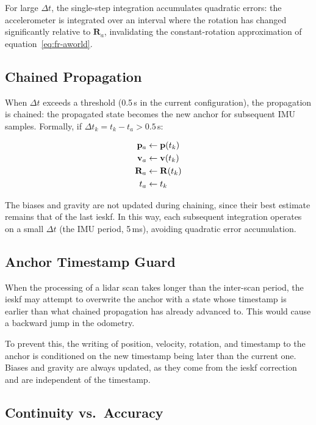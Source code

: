For large $\Delta t$, the single-step integration accumulates quadratic errors: the
accelerometer is integrated over an interval where the rotation has changed
significantly relative to $\mathbf{R}_a$, invalidating the constant-rotation
approximation of equation~\eqref{eq:fr-aworld}.

\subsection{Chained Propagation}
\label{sec:fr-chaining}

When $\Delta t$ exceeds a threshold (0.5\,s in the current configuration), the
propagation is chained: the propagated state becomes the new anchor for subsequent
IMU samples. Formally, if $\Delta t_k = t_k - t_a > 0.5$\,s:

\begin{align}
    \mathbf{p}_a &\leftarrow \mathbf{p}(t_k) \notag \\
    \mathbf{v}_a &\leftarrow \mathbf{v}(t_k)
    \label{eq:fr-chain} \\
    \mathbf{R}_a &\leftarrow \mathbf{R}(t_k) \notag \\
    t_a &\leftarrow t_k \notag
\end{align}

The biases and gravity are not updated during chaining, since their best estimate
remains that of the last \gls{ieskf}. In this way, each subsequent integration
operates on a small $\Delta t$ (the IMU period, 5\,ms), avoiding quadratic error
accumulation.

\subsection{Anchor Timestamp Guard}
\label{sec:fr-timestamp-guard}

When the processing of a \gls{lidar} scan takes longer than the inter-scan period,
the \gls{ieskf} may attempt to overwrite the anchor with a state whose timestamp is
earlier than what chained propagation has already advanced to. This would cause a
backward jump in the odometry.

To prevent this, the writing of position, velocity, rotation, and timestamp to the
anchor is conditioned on the new timestamp being later than the current one. Biases
and gravity are always updated, as they come from the \gls{ieskf} correction and are
independent of the timestamp.

\subsection{Continuity vs.\ Accuracy}
\label{sec:fr-continuity}

